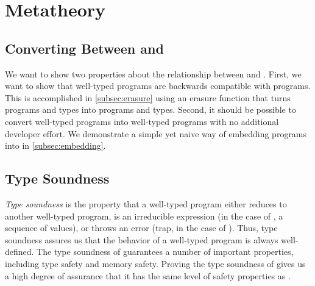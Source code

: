 \chapter{Metatheory}
\label{chp:metatheory}

\section{Converting Between \wasm and \name}
We want to show two properties about the relationship between \wasm and \name.
First, we want to show that well-typed \name programs are backwards compatible with \wasm programs.
This is accomplished in \autoref{subsec:erasure} using an erasure function that turns \name programs and types into \wasm programs and types.
Second, it should be possible to convert well-typed \wasm programs into well-typed \name programs with no additional developer effort.
We demonstrate a simple yet naive way of embedding \wasm programs into \name in \autoref{subsec:embedding}.




\section{Type Soundness}
\label{sec:typesoundness}
\emph{Type soundness} is the property that a well-typed program either reduces to another well-typed program, is an irreducible expression (in the case of \name, a sequence of values), or throws an error (trap, in the case of \name).
Thus, type soundness assures us that the behavior of a well-typed program is always well-defined.
The type soundness of \wasm guarantees a number of important properties, including type safety and memory safety.
Proving the type soundness of \name gives us a high degree of assurance that it has the same level of safety properties as \wasm.

